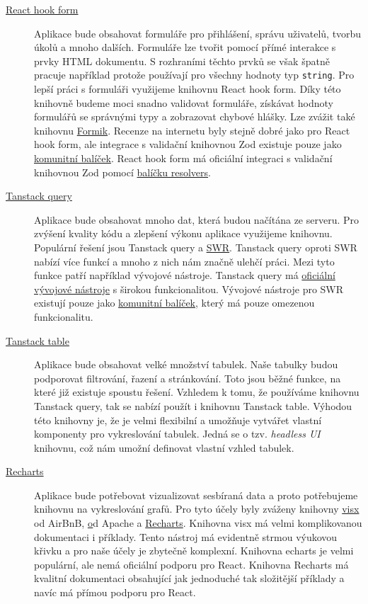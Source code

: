 \begin{description}
    \item[\href{https://react-hook-form.com/}{React hook form}]
    Aplikace bude obsahovat formuláře pro přihlášení, správu uživatelů, tvorbu úkolů a mnoho dalších.
    Formuláře lze tvořit pomocí přímé interakce s prvky HTML dokumentu.
    S rozhraními těchto prvků se však špatně pracuje například protože používají pro všechny hodnoty typ \texttt{string}.
    Pro lepší práci s formuláři využijeme knihovnu React hook form.
    Díky této knihovně budeme moci snadno validovat formuláře, získávat hodnoty formulářů se správnými typy a zobrazovat chybové hlášky.
    Lze zvážit také knihovnu \href{https://formik.org}{Formik}.
    Recenze na internetu byly stejně dobré jako pro React hook form, ale integrace s validační knihovnou Zod existuje pouze jako \href{https://github.com/robertLichtnow/zod-formik-adapter}{komunitní balíček}.
    React hook form má oficiální integraci s validační knihovnou Zod pomocí \href{https://github.com/react-hook-form/resolvers}{balíčku resolvers}.
    \item[\href{https://tanstack.com/query/latest}{Tanstack query}]
    Aplikace bude obsahovat mnoho dat, která budou načítána ze serveru.
    Pro zvýšení kvality kódu a zlepšení výkonu aplikace využijeme knihovnu.
    Populární řešení jsou Tanstack query a \href{https://swr.vercel.app/}{SWR}\@.
    Tanstack query oproti SWR nabízí více funkcí a mnoho z nich nám značně ulehčí práci.
    Mezi tyto funkce patří například vývojové nástroje.
    Tanstack query má \href{https://tanstack.com/query/v4/docs/react/devtools}{oficiální vývojové nástroje} s širokou funkcionalitou.
    Vývojové nástroje pro SWR existují pouze jako \href{https://github.com/koba04/swr-devtools}{komunitní balíček}, který má pouze omezenou funkcionalitu.
    \item[\href{https://tanstack.com/table/v8}{Tanstack table}]
    Aplikace bude obsahovat velké množství tabulek.
    Naše tabulky budou podporovat filtrování, řazení a stránkování.
    Toto jsou běžné funkce, na které již existuje spoustu řešení.
    Vzhledem k tomu, že používáme knihovnu Tanstack query, tak se nabízí použít i knihovnu Tanstack table.
    Výhodou této knihovny je, že je velmi flexibilní a umožňuje vytvářet vlastní komponenty pro vykreslování tabulek.
    Jedná se o tzv. \textit{headless UI} knihovnu, což nám umožní definovat vlastní vzhled tabulek.
    \item[\href{https://recharts.org/en-US/}{Recharts}]
    Aplikace bude potřebovat vizualizovat sesbíraná data a proto potřebujeme knihovnu na vykreslování grafů.
    Pro tyto účely byly zváženy knihovny \href{https://github.com/airbnb/visx}{visx} od AirBnB, \href{https://github.com/apache/echarts} od Apache a \href{https://github.com/recharts/recharts}{Recharts}.
    Knihovna visx má velmi komplikovanou dokumentaci i příklady.
    Tento nástroj má evidentně strmou výukovou křivku a pro naše účely je zbytečně komplexní.
    Knihovna echarts je velmi populární, ale nemá oficiální podporu pro React.
    Knihovna Recharts má kvalitní dokumentaci obsahující jak jednoduché tak složitější příklady a navíc má přímou podporu pro React.
\end{description}

